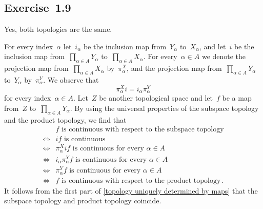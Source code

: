 \subsection{Exercise~1.9}
\label{exercise 1.9}

Yes, both topologies are the same.

For every index~$α$ let~$i_α$ be the inclusion map from~$Y_α$ to~$X_α$, and let~$i$ be the inclusion map from~$∏_{α ∈ A} Y_α$ to~$∏_{α ∈ A} X_α$.
For every~$α ∈ A$ we denote the projection map from~$∏_{α ∈ A} X_α$ by~$π^X_α$, and the projection map from~$∏_{α ∈ A} Y_α$ to~$Y_α$ by~$π^Y_α$.
We observe that
\[
	π^X_α i = i_α π^Y_α
\]
for every index~$α ∈ A$.
Let~$Z$ be another topological space and let~$f$ be a map from~$Z$ to~$∏_{α ∈ A} Y_α$.
By using the universal properties of the subspace topology and the product topology, we find that
\begin{align*}
	{}&
	\text{$f$ is continuous with respect to the subspace topology}
	\\
	\iff{}&
	\text{$i f$ is continuous}
	\\
	\iff{}&
	\text{$π^X_α i f$ is continuous for every~$α ∈ A$}
	\\
	\iff{}&
	\text{$i_α π^Y_α f$ is continuous for every~$α ∈ A$}
	\\
	\iff{}&
	\text{$π^Y_α f$ is continuous for every~$α ∈ A$}
	\\
	\iff{}&
	\text{$f$ is continuous with respect to the product topology} \,.
\end{align*}
It follows from the first part of \cref{topology uniquely determined by maps} that the subspace topology and product topology coincide.
